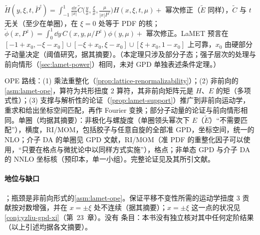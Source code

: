 \begin{theorem}\label{thm:lamet-quasi-gpd}
$\tilde H(y,\xi,t,\bar P^z)=\int_{-1}^1\frac{\dd x}{|x|}\tilde C\big(\frac yx,\frac\xi x,\frac\mu{|x|\bar P^z}\big)H(x,\xi,t,\mu)+$ 幂次修正（$\tilde E$ 同样），$\tilde C$ 与 $t$ 无关（至少在单圈），在 $\xi=0$ 处等于 PDF 的核；$\tilde\phi(x,P^z)=\int_0^1\dd y\,C(x,y,\mu/P^z)\phi(y,\mu)+$ 幂次修正。LaMET 预言在 $[-1+x_0,-\xi-x_0]\cup[-\xi+x_0,\xi-x_0]\cup[\xi+x_0,1-x_0]$ 上可靠，$x_0$ 由硬部分子动量决定\cite{Holligan:2025baj}（阈值研究，据其摘要）。（本定理只涉及部分子态；强子层次的处理与前向情形（\cref{sec:lamet-power}）相同，未对 GPD 单独表述条件定理。）
\end{theorem}

\begin{proofsketch}
OPE 路线：(1) 乘法重整化（\cref{prop:lattice-renormalizability}）；(2) 非前向的\cref{asm:lamet-ope}，算符为共形扭度 2 算符，其非前向矩阵元是 $H$、$E$ 的矩（多项式性）；(3) 支撑与解析性的论证（\cref{prop:lamet-support}）推广到非前向运动学，重求和给出坐标空间匹配，再作 Fourier 变换；部分子动量的论证与前向情形相同。单圈（均据其摘要）：非极化与螺旋度\cite{Ji:2015qla}（单圈领头幂次下 $E$（$\tilde E$）“不需要匹配”），横度\cite{Xiong:2015nua}，RI/MOM\cite{Liu:2019urm}，包括胶子与任意自旋的全部准 GPD\cite{Ma:2022ggj}，坐标空间\cite{Radyushkin:2019owq}，统一的 NLO\cite{Yao:2022vtp}；介子 DA 的单圈见 GPD 文献，RI/MOM\cite{Liu:2018tox}（准 PDF 的重整化因子可以使用，“只要在格点与微扰论中以同样方式实施”），格点\cite{Zhang:2017bzy,LatticeParton:2022zqc,Holligan:2023rex}；非单态 GPD 与介子 DA 的 NNLO 坐标核\cite{Ji:2025mvk}（预印本，单一小组）。完整论证见\cite{JiEtAl2021}及其所引文献。
\end{proofsketch}

\paragraph{地位与缺口}
\tagA；瓶颈是非前向形式的\cref{asm:lamet-ope}。保证平移不变性所需的运动学扭度 3 贡献按对数增强，并在 $x=\pm\xi$ 处不连续\cite{Braun:2023alc}（据其摘要）；$x=\pm\xi$ 这一点的状况见\cref{conj:yzliu-gpd-xi}（第~23~章）。没有 \tagR 条目：本书没有独立核对其中任何定阶结果（以上引述均据各文摘要）。

